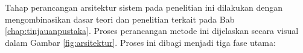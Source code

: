   Tahap perancangan arsitektur sistem pada penelitian 
  ini dilakukan dengan mengombinasikan dasar teori dan 
  penelitian terkait pada Bab \ref{chap:tinjauanpustaka}. 
  Proses perancangan metode ini dijelaskan secara visual 
  dalam Gambar \ref{fig:arsitektur}. 
  Proses ini dibagi menjadi tiga fase utama:
